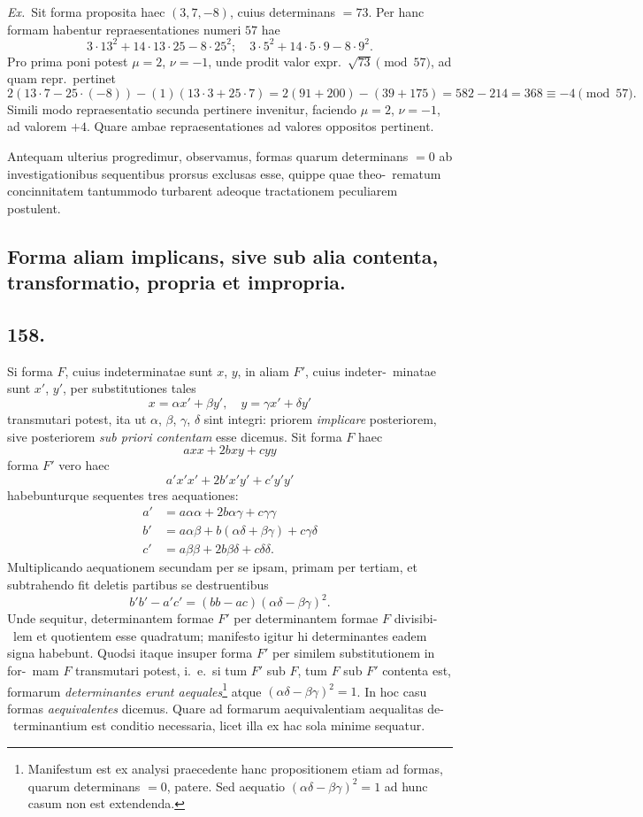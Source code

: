 \documentclass[12pt,a4paper]{article}
\theoremstyle{plain}
\theoremstyle{definition}
\theoremstyle{remark}
\begin{document}
\emph{Ex.}\ Sit forma proposita haec $(3, 7, -8)$, cuius determinans $= 73$. Per
hanc formam habentur repraesentationes numeri $57$ hae
\[
3 \cdot 13^2 + 14 \cdot 13 \cdot 25 - 8 \cdot 25^2; \quad 3 \cdot 5^2 + 14 \cdot 5 \cdot 9 - 8 \cdot 9^2.
\]
Pro prima poni potest $\mu = 2$, $\nu = -1$, unde prodit valor expr.\ $\sqrt{73} \pmod{57}$,
ad quam repr.\ pertinet
\[
2(13 \cdot 7 - 25 \cdot (-8)) - (1)(13 \cdot 3 + 25 \cdot 7) = 2(91 + 200) - (39 + 175) = 582 - 214 = 368 \equiv -4 \pmod{57}.
\]
Simili modo repraesentatio secunda pertinere invenitur, faciendo $\mu = 2$, $\nu = -1$,
ad valorem $+4$. Quare ambae repraesentationes ad valores oppositos pertinent.

Antequam ulterius progredimur, observamus, formas quarum determinans
$= 0$ ab investigationibus sequentibus prorsus exclusas esse, quippe quae theo-\ rematum concinnitatem tantummodo turbarent adeoque tractationem peculiarem
postulent.


\subsection*{Forma aliam implicans, sive sub alia contenta, transformatio, propria et impropria.}

\subsection*{158.}

Si forma $F$, cuius indeterminatae sunt $x$, $y$, in aliam $F'$, cuius indeter-\ minatae sunt $x'$, $y'$, per substitutiones tales
\[
x = \alpha x' + \beta y', \quad y = \gamma x' + \delta y'
\]
transmutari potest, ita ut $\alpha$, $\beta$, $\gamma$, $\delta$ sint integri: priorem \emph{implicare} posteriorem,
sive posteriorem \emph{sub priori contentam} esse dicemus. Sit forma $F$ haec
\[
axx + 2bxy + cyy
\]
forma $F'$ vero haec
\[
a'x'x' + 2b'x'y' + c'y'y'
\]
habebunturque sequentes tres aequationes:
\begin{align*}
a' &= a\alpha\alpha + 2b\alpha\gamma + c\gamma\gamma \\
b' &= a\alpha\beta + b(\alpha\delta + \beta\gamma) + c\gamma\delta \\
c' &= a\beta\beta + 2b\beta\delta + c\delta\delta.
\end{align*}
Multiplicando aequationem secundam per se ipsam, primam per tertiam, et
subtrahendo fit deletis partibus se destruentibus
\[
b'b' - a'c' = (bb - ac)(\alpha\delta - \beta\gamma)^2.
\]
Unde sequitur, determinantem formae $F'$ per determinantem formae $F$ divisibi-\ lem et quotientem esse quadratum; manifesto igitur hi determinantes eadem signa
habebunt. Quodsi itaque insuper forma $F'$ per similem substitutionem in for-\ mam $F$ transmutari potest, i.~e.\ si tum $F'$ sub $F$, tum $F$ sub $F'$ contenta est,
formarum \emph{determinantes erunt aequales}\footnote{Manifestum est ex analysi praecedente hanc propositionem etiam ad formas, quarum determinans $= 0$, patere. Sed aequatio $(\alpha\delta - \beta\gamma)^2 = 1$ ad hunc casum non est extendenda.} atque $(\alpha\delta - \beta\gamma)^2 = 1$. In hoc casu
formas \emph{aequivalentes} dicemus. Quare ad formarum aequivalentiam aequalitas de-\ terminantium est conditio necessaria, licet illa ex hac sola minime sequatur.
\end{document}
